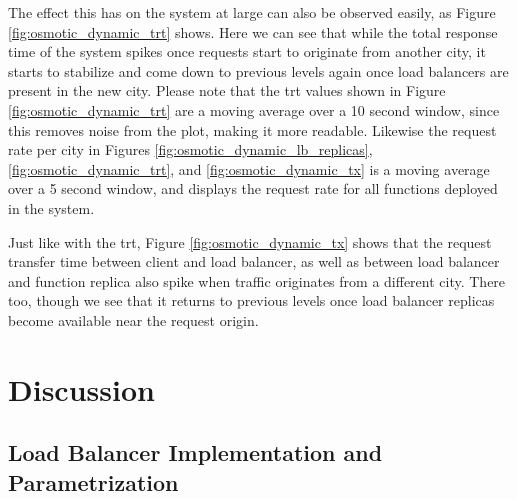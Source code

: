 \documentclass[draft,final]{vutinfth} %
\begin{document}
The effect this has on the system at large can also be observed easily, as Figure \ref{fig:osmotic_dynamic_trt} shows.
Here we can see that while the total response time of the system spikes once requests start to originate from another city, it starts to stabilize and come down to previous levels again once load balancers are present in the new city.
Please note that the \gls{trt} values shown in Figure \ref{fig:osmotic_dynamic_trt} are a moving average over a 10 second window, since this removes noise from the plot, making it more readable.
Likewise the request rate per city in Figures \ref{fig:osmotic_dynamic_lb_replicas}, \ref{fig:osmotic_dynamic_trt}, and \ref{fig:osmotic_dynamic_tx} is a moving average over a 5 second window, and displays the request rate for all functions deployed in the system.

Just like with the \gls{trt}, Figure \ref{fig:osmotic_dynamic_tx} shows that the request transfer time between client and load balancer, as well as between load balancer and function replica also spike when traffic originates from a different city.
There too, though we see that it returns to previous levels once load balancer replicas become available near the request origin.

\chapter{Discussion}





\section{Load Balancer Implementation and Parametrization}
\end{document}
